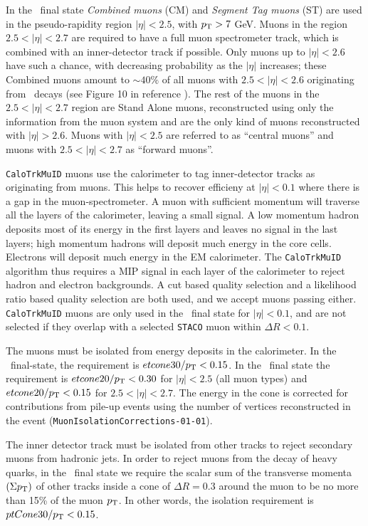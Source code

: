 In the \llll\ final state {\it Combined muons} (CM) and {\it Segment Tag muons}
(ST) are used in the pseudo-rapidity region $|\eta| < 2.5$, with $p_{\mathrm{T}}>7$ GeV. 
Muons in the region $2.5 < |\eta| < 2.7$ are required to have a full muon spectrometer track,
which is combined with an inner-detector track if possible.
Only muons up to $|\eta|<2.6$ have such a chance, with decreasing probability 
as the $|\eta|$ increases; these Combined muons amount to $\sim 40\%$ of 
all muons with $2.5<|\eta|<2.6$ originating from \Z\ decays (see Figure 10 in reference \cite{ATL-COM-MUON-2011-026}). The rest of the muons in the $2.5<|\eta|<2.7$ region are Stand Alone muons, reconstructed using only the information from the muon system and are the only kind of muons reconstructed with $|\eta|>2.6$.
Muons with $|\eta| < 2.5$ are referred to as ``central muons'' and muons with
$2.5 < |\eta| < 2.7$ as ``forward muons''. 

\verb|CaloTrkMuID| muons use the calorimeter to tag inner-detector tracks as
originating from muons. This helps to recover efficieny at $|\eta|<0.1$ where
there is a gap in the muon-spectrometer. A muon with sufficient momentum
will traverse all the layers of the calorimeter, leaving a small signal. 
A low momentum hadron deposits
most of its energy in the first layers and leaves no signal in the last layers;
high momentum hadrons will deposit much energy in the core cells. 
Electrons will deposit much energy in the EM calorimeter. The \verb|CaloTrkMuID|
algorithm thus requires a MIP signal in each layer of the calorimeter to reject
hadron and electron backgrounds. A cut based quality selection and a likelihood
ratio based quality selection are both used, and we accept muons passing either.
\verb|CaloTrkMuID| muons are only used in the \llll\ final state for
$|\eta|<0.1$, and are not selected if they overlap with a selected \verb|STACO|
muon within $\Delta R<0.1$.

The muons must be isolated from energy deposits in the calorimeter. In the \llvv\
final-state, the
requirement is $etcone30/p_{\mathrm{T}} < 0.15$. In the \llll\ final state the
requirement is $etcone20/p_{\mathrm{T}} < 0.30$ for $|\eta|<2.5$ (all muon types) and
$etcone20/p_{\mathrm{T}} < 0.15$ for $2.5<|\eta|<2.7$.
The energy in the cone is corrected for contributions from pile-up events using the number of vertices reconstructed in the event (\texttt{MuonIsolationCorrections-01-01}).

The inner detector track must be isolated from other tracks to reject secondary
muons from hadronic jets. In order to reject muons from the decay of heavy
quarks, in the \llvv\ final state we require the scalar sum of the transverse
momenta $(\Sigma p_{\mathrm{T}})$ of other tracks inside a cone of $\Delta R=0.3$ around
the muon to be no more than 15\% of the muon $p_{\mathrm{T}}$. In other words, the
isolation requirement is $ptCone30/p_{\mathrm{T}} < 0.15$. 

